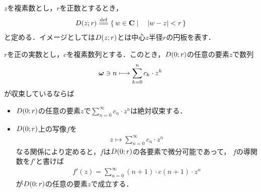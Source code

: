 	$z$を複素数とし，$r$を正数とするとき，
	\begin{align}
		\disc{z}{r} \defeq \Set{w \in \C}{|w - z| < r}
		\label{definition_of_disc_on_plane}
	\end{align}
	と定める．イメージとしては$D(z;r)$とは中心$z$半径$r$の円板を表す．
	
	\begin{screen}
		\begin{thm}[級数で表される関数は微分可能]
		\label{thm:series_expanded_then_differentiable}
			$r$を正の実数とし，$c$を複素数列とする．このとき，$D(0;r)$の任意の要素$z$で数列
			\begin{align}
				{\boldsymbol \omega} \ni n \longmapsto \sum_{k=0}^{n} c_{k} \cdot z^{k}
			\end{align}
			が収束しているならば
			\begin{itemize}
				\item $D(0;r)$の任意の要素$z$で$\sum_{n=0}^{\infty} c_{n} \cdot z^{n}$は絶対収束する．
				\item $D(0;r)$上の写像$f$を
					\begin{align}
						z \longmapsto \sum_{n=0}^{\infty} c_{n} \cdot z^{n}
					\end{align}
					なる関係により定めると，$f$は$D(0;r)$の各要素で微分可能であって，
					$f$の導関数を$f'$と書けば
					\begin{align}
						f'(z) = \sum_{n=0}^{\infty} (n+1) \cdot c(n+1) \cdot z^{n}
					\end{align}
					が$D(0;r)$の任意の要素$z$で成立する．
			\end{itemize}
		\end{thm}
	\end{screen}
	
